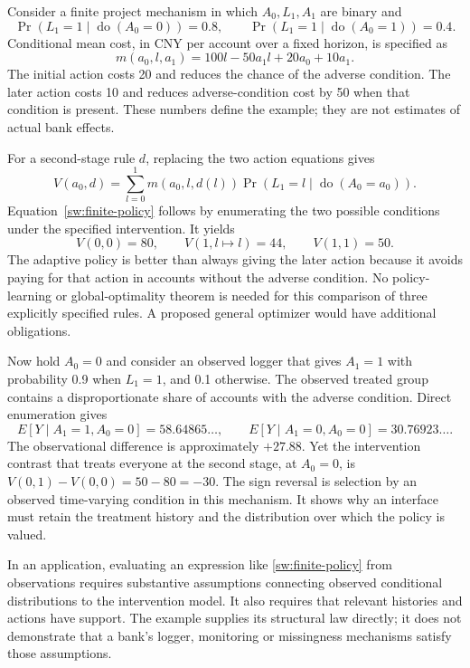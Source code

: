 Consider a finite project mechanism in which \(A_0,L_1,A_1\) are binary and
\[
 \Pr(L_1=1\mid\operatorname{do}(A_0=0))=0.8,
 \qquad
 \Pr(L_1=1\mid\operatorname{do}(A_0=1))=0.4.
\]
Conditional mean cost, in CNY per account over a fixed horizon, is specified as
\[
 m(a_0,l,a_1)=100l-50a_1l+20a_0+10a_1.
\]
The initial action costs 20 and reduces the chance of the adverse condition.
The later action costs 10 and reduces adverse-condition cost by 50 when that
condition is present. These numbers define the example; they are not estimates
of actual bank effects.

For a second-stage rule \(d\), replacing the two action equations gives
\begin{equation}
 V(a_0,d)=\sum_{l=0}^{1}m(a_0,l,d(l))
             \Pr(L_1=l\mid\operatorname{do}(A_0=a_0)).
 \label{sw:finite-policy}
\end{equation}
Equation~\eqref{sw:finite-policy} follows by enumerating the two possible
conditions under the specified intervention. It yields
\[
 V(0,0)=80,\qquad V(1,l\mapsto l)=44,\qquad V(1,1)=50.
\]
The adaptive policy is better than always giving the later action because it
avoids paying for that action in accounts without the adverse condition.
No policy-learning or global-optimality theorem is needed for this comparison
of three explicitly specified rules. A proposed general optimizer would have
additional obligations.

Now hold \(A_0=0\) and consider an observed logger that gives \(A_1=1\) with
probability 0.9 when \(L_1=1\), and 0.1 otherwise. The observed treated group
contains a disproportionate share of accounts with the adverse condition.
Direct enumeration gives
\[
 E[Y\mid A_1=1,A_0=0]=58.64865\ldots,
 \qquad E[Y\mid A_1=0,A_0=0]=30.76923\ldots.
\]
The observational difference is approximately \(+27.88\). Yet the intervention
contrast that treats everyone at the second stage, at \(A_0=0\), is
\(V(0,1)-V(0,0)=50-80=-30\). The sign reversal is selection by an observed
time-varying condition in this mechanism. It shows why an interface must retain
the treatment history and the distribution over which the policy is valued.

In an application, evaluating an expression like
\eqref{sw:finite-policy} from observations requires substantive assumptions
connecting observed conditional distributions to the intervention model. It
also requires that relevant histories and actions have support. The example
supplies its structural law directly; it does not demonstrate that a bank's
logger, monitoring or missingness mechanisms satisfy those assumptions.


